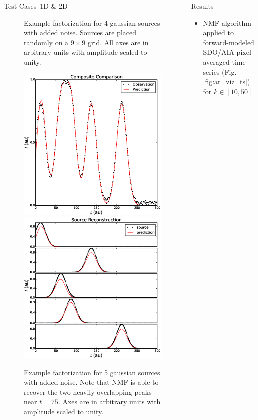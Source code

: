 \documentclass[final]{beamer}
\begin{document}
\begin{frame}{}
\begin{columns}[t]
\begin{column}{.32\linewidth}
\begin{block}{Test Cases--1D \& 2D}
\begin{figure}
				\caption{\footnotesize Example factorization for 4 gaussian sources with added noise. Sources are placed randomly on a $9\times9$ grid. All axes are in arbitrary units with amplitude scaled to unity.}
				\label{fig:test_case_2D}
			\end{figure}
			\begin{figure}
				\includegraphics[width=0.5\columnwidth]{figures/ts_total_example.eps}
				\includegraphics[width=0.5\columnwidth]{figures/ts_source_example.eps}
				\caption{\footnotesize Example factorization for 5 gaussian sources with added noise. Note that NMF is able to recover the two heavily overlapping peaks near $t=75$. Axes are in arbitrary units with amplitude scaled to unity.}
				\label{fig:test_case_1D}
			\end{figure}
		\end{block}
      \end{column}
      \begin{column}{.32\linewidth}
        \begin{block}{Results}
          \begin{itemize}
          \item NMF algorithm applied to forward-modeled SDO/AIA pixel-averaged time series (Fig. \ref{fig:ar_viz_ts}) for $k\in[10,50]$ 

\end{itemize}
\end{block}
\end{column}
\end{columns}
\end{frame}
\end{document}
